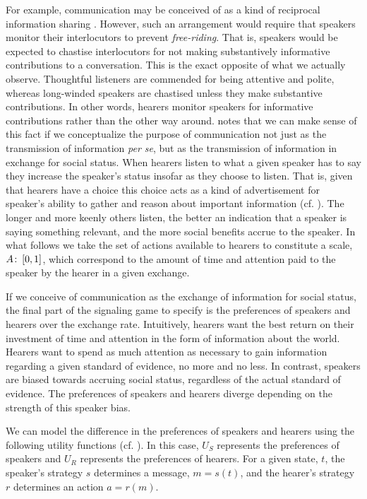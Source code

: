 \documentclass[linguex]{sp}
\theoremstyle{definition} \newtheorem{definition}{Definition}
\begin{document}
For example,  communication may be conceived of as a kind of  reciprocal information sharing \citep{trivers1971}. However, such an arrangement would require that speakers monitor their interlocutors to prevent \emph{free-riding}. That is, speakers would be expected to chastise interlocutors for not making substantively informative contributions to a conversation. This is the exact opposite of what we actually observe. Thoughtful listeners are commended for being attentive and polite, whereas long-winded speakers are chastised unless they make substantive contributions. In other words, hearers monitor speakers for informative contributions rather than the other way around. \cite{dessalles2007} notes that we can make sense of this fact if we conceptualize the purpose of communication not just as the transmission of information \emph{per se}, but as the transmission of information in exchange for social status.  When hearers listen to what a given speaker has to say they increase the speaker's status insofar as they choose to listen. That is, given that hearers have a choice this choice acts as a kind of advertisement for speaker's ability to gather and reason about important information (cf. \citealt{gintis2001,dessalles2014}).  The longer and more keenly others listen, the better an indication that a speaker is saying something relevant, and the more social benefits accrue to the speaker. In what follows we take the set of actions available to hearers to constitute a scale, $A \colon\thinspace [0,1]$, which correspond to the amount of time and attention paid to the speaker by the hearer in a given exchange.

If we conceive of communication as the exchange of information for social status, the final part of the signaling game to specify is the preferences of speakers and hearers over the exchange rate. Intuitively, hearers want the best return on their investment of time and attention in the form of information about the world. Hearers want to spend as much attention as necessary to gain information regarding a given standard of evidence, no more and no less.  In contrast, speakers are biased towards accruing social status, regardless of the actual standard of evidence. The preferences of speakers and hearers diverge depending on the strength of this speaker bias. 

We can model the difference in the preferences of speakers and hearers  using the following utility functions (cf. \citealt{crawford-sobel:1982}). In this case, $U_S$ represents the preferences of speakers and $U_R$ represents the preferences of hearers. For a given state, $t$, the speaker's strategy $s$ determines a message, $m = s(t)$, and the hearer's strategy $r$ determines an action $a = r(m)$. 
\end{document}
